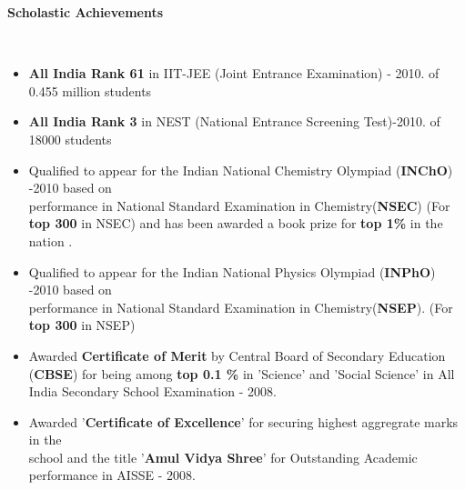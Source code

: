 \documentclass[a4paper,11pt]{article}
\newcommand{\lsep}{-0.5cm}
\newcommand{\resheading}[1]{{\small \colorbox{mygrey}{\begin{minipage}{0.975\textwidth}{\textbf{#1 \vphantom{p\^{E}}}}\end{minipage}}}}
\begin{document}
\resheading{\textbf{\large Scholastic Achievements}}\\[\lsep]
\begin{itemize}
  \item \textbf{All India Rank 61} in IIT-JEE (Joint Entrance Examination) - 2010. of 0.455 million students\\[-0.7cm]
  \item \textbf{All India Rank 3} in NEST (National Entrance Screening Test)-2010. of 18000 students \\[-0.7cm]

 \item Qualified to appear for the Indian National Chemistry Olympiad (\textbf{INChO}) -2010 based on \\performance in National Standard Examination in Chemistry(\textbf{NSEC}) (For \textbf{top 300} in NSEC) and has been awarded a book prize for \textbf{top 1\%} in the nation .\\[-0.7cm]
  \item Qualified to appear for the Indian National Physics Olympiad (\textbf{INPhO}) -2010 based on \\ performance in National Standard Examination in Chemistry(\textbf{NSEP}). (For \textbf{top 300} in NSEP) 
  
  \item Awarded \textbf{Certificate of Merit} by Central Board of Secondary Education (\textbf{CBSE}) for being among \textbf{top 0.1 \%} in 'Science' and 'Social Science' in All India Secondary School Examination - 2008. \\[-0.7cm]
 \item Awarded '\textbf{Certificate of Excellence}' for securing highest aggregrate marks in the \\ school and  the title '\textbf{Amul Vidya Shree}' for Outstanding Academic performance in AISSE - 2008.\\[-0.7cm]


\end{itemize}
\end{document}

